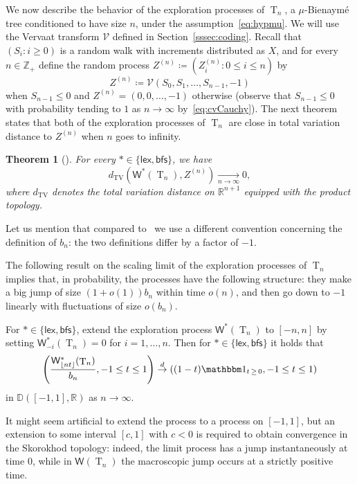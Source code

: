 \documentclass[10pt]{amsart}
\newtheorem{theo}{Theorem}[section]
\theoremstyle{definition}\newtheorem{defi}[theo]{Definition}\newtheorem{rema}[theo]{Remark}\newtheorem{exam}[theo]{Example}\newtheorem{exem}[theo]{Example}\newtheorem{nota}[theo]{Notation}
\newcommand{\R}{\mathbb{R}}
\newcommand{\Z}{\mathbb{Z}}
\newcommand{\D}{\mathbb{D}}
\newcommand*\W{\mathsf{W}}
\newcommand{\bfs}{\mathsf{bfs}}
\newcommand{\lex}{\mathsf{lex}}
\DeclareMathOperator{\rtree}{T}
\DeclareMathOperator{\TV}{TV}
\newcommand{\cV}{\mathcal{V}}
\newcommand{\I}[1]{{\mathbbm 1}_{#1}}
\begin{document}
We now describe the behavior of the exploration processes of $ \rtree_{n}$, a $\mu$-Bienaymé tree conditioned to have size $n$, under the assumption~\eqref{eq:hypmu}. We will use the Vervaat transform $\cV$ defined in Section~\ref{sssec:coding}. Recall that $(S_i : i \geq 0)$ is a random walk with increments distributed as $X$, and for every $n\in\Z_+$ define the random process $Z^{(n)} \coloneqq (Z^{(n)}_{i} : 0\leq i \leq n)$ by
\begin{equation}\label{eqn:ZnVervaat}
Z^{(n)} \coloneqq \cV(S_0,S_1,\ldots,S_{n-1},-1)
\end{equation}
when $S_{n-1} \leq 0$ and $Z^{(n)}=(0,0, \ldots,-1)$ otherwise (observe that $S_{n-1} \leq 0$ with probability tending to $1$ as $ n \rightarrow \infty$ by~\eqref{eq:cvCauchy}). The next theorem states that both of the exploration processes of $ \rtree_{n}$ are close in total variation distance to $Z^{(n)}$ when $n$ goes to infinity.
\begin{theo}[{\cite[Theorem~21]{KR19}}]\label{thm:dTVLoc}
For every $\ast \in \{\lex,\bfs\}$, we have
\[
d_{\TV}\left(\W^{\ast}(\rtree_{n}), Z^{(n)}\right) \xrightarrow[n\to\infty]{} 0,
\]
where $d_{\TV}$ denotes the total variation distance on $\R^{n+1}$ equipped with the product topology.
\end{theo}

Let us mention that compared to~\cite{KR19} we use a different convention concerning the definition of $b_{n}$: the two definitions differ by a factor of $-1$.

The following result on the scaling limit of the exploration processes of $ \rtree_{ n}$ implies that, in probability, the processes have the following structure: they make a big jump of size $(1+o(1))b_n$ within time $o(n)$, and then go down to $-1$ linearly with fluctuations of size $o(b_n)$.

\begin{prop}[{\cite[Proposition~24]{KR19}}]\label{prop:functional_conv_W}
\label{prop:W}
For $\ast \in \{\lex,\bfs\}$, extend the exploration process $\W^{\ast}(\rtree_{ n})$ to $[-n,n]$ by setting $\W^{\ast}_{-i}(\rtree_{ n})=0$ for $i=1,\dots, n$. Then for $\ast \in \{\lex,\bfs\}$ it holds that
\[
\left(\frac{\W^{\ast}_{\lfloor n t \rfloor}(\rtree_{ n})}{b_n}, -1\leq t \leq 1 \right) \overset{d}{\to} \left((1-t)\I{t\,\geq\,0},-1\leq t \leq 1 \right)
\]
in $\D([-1,1],\R)$ as $n\to \infty$.
\end{prop}

It might seem artificial to extend the process to a process on $[-1,1]$, but an extension to some interval $[c,1]$ with $c <0$ is required to obtain convergence in the Skorokhod topology: indeed, the limit process has a jump instantaneously at time 0, while in $\W(\rtree_{ n})$ the macroscopic jump occurs at a strictly positive time.
\end{document}
